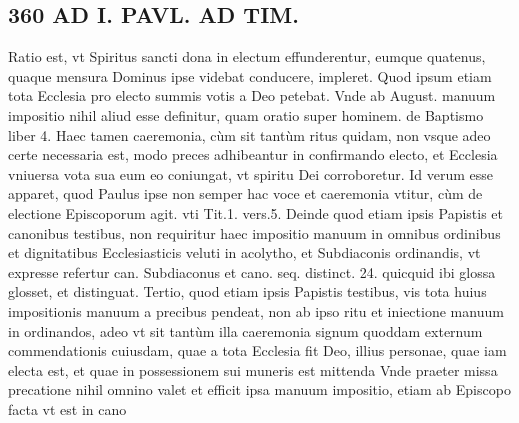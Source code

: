 \documentclass{article}
\begin{document}
\begin{pages}
\section*{360 AD I. PAVL. AD TIM. }
\marginpar{[ p.]} Ratio est, vt Spiritus sancti dona in electum effunderentur, eumque quatenus, quaque mensura Dominus ipse videbat conducere, impleret. Quod ipsum etiam tota Ecclesia pro electo summis votis a Deo petebat. Vnde ab August. manuum impositio nihil aliud esse definitur, quam oratio super hominem. de Baptismo liber 4.  \pend\pstart Haec tamen caeremonia, cùm sit tantùm ritus quidam, non vsque adeo certe necessaria est, modo preces adhibeantur in confirmando electo, et Ecclesia vniuersa vota sua eum eo coniungat, vt spiritu Dei corroboretur. Id verum esse apparet, quod Paulus ipse non semper hac voce et caeremonia vtitur, cùm de electione Episcoporum agit. vti Tit.1. vers.5.  \pend\pstart Deinde quod etiam ipsis Papistis et canonibus testibus, non requiritur haec impositio manuum in omnibus ordinibus et dignitatibus Ecclesiasticis veluti in acolytho, et Subdiaconis ordinandis, vt expresse refertur can. Subdiaconus et cano. seq. distinct. 24. quicquid ibi glossa glosset, et distinguat.  \pend\pstart Tertio, quod etiam ipsis Papistis testibus, vis tota huius impositionis manuum a precibus pendeat, non ab ipso ritu et iniectione manuum in ordinandos, adeo vt sit tantùm illa caeremonia signum quoddam externum commendationis cuiusdam, quae a tota Ecclesia fit Deo, illius personae, quae iam electa est, et quae in possessionem sui muneris est mittenda Vnde praeter missa precatione nihil omnino valet et efficit ipsa manuum impositio, etiam ab Episcopo facta vt est in cano  \pend

\end{pages}
\end{document}
